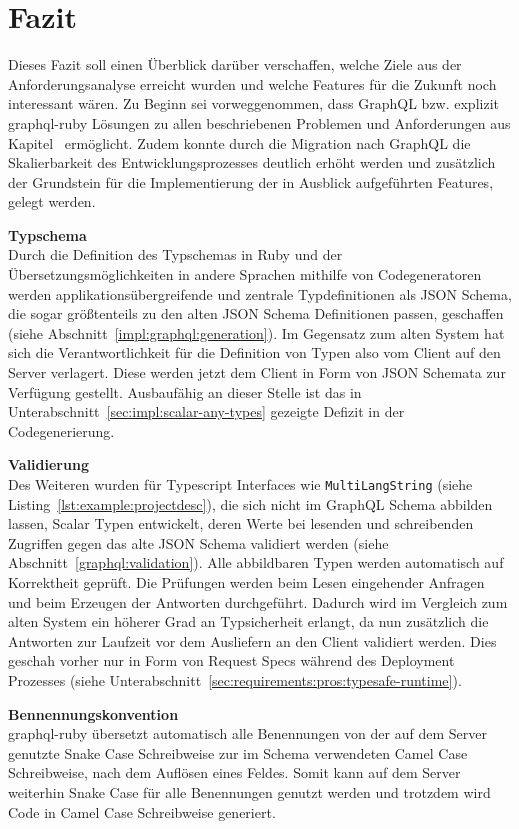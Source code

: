 \chapter{Fazit}
Dieses Fazit soll einen Überblick darüber verschaffen, welche Ziele aus der Anforderungsanalyse erreicht wurden und welche Features für die Zukunft noch interessant wären.
Zu Beginn sei vorweggenommen, dass GraphQL bzw. explizit graphql-ruby Lösungen zu allen beschriebenen Problemen und Anforderungen aus Kapitel~ ermöglicht. Zudem konnte durch die Migration nach GraphQL die Skalierbarkeit des Entwicklungsprozesses deutlich erhöht werden und zusätzlich der Grundstein für die Implementierung der in Ausblick aufgeführten Features, gelegt werden.

\textbf{Typschema} \ \\
Durch die Definition des Typschemas in Ruby und der Übersetzungsmöglichkeiten in andere Sprachen mithilfe von Codegeneratoren werden applikationsübergreifende und zentrale Typdefinitionen als JSON Schema,
die sogar größtenteils zu den alten JSON Schema Definitionen passen, geschaffen (siehe Abschnitt~\ref{impl:graphql:generation}). Im Gegensatz zum alten System hat sich die Verantwortlichkeit für die Definition von Typen also vom Client auf den Server verlagert. Diese werden jetzt dem Client in Form von JSON Schemata zur Verfügung gestellt. Ausbaufähig an dieser Stelle ist das in Unterabschnitt~\ref{sec:impl:scalar-any-types} gezeigte Defizit in der Codegenerierung.

\textbf{Validierung} \ \\
Des Weiteren wurden für Typescript Interfaces wie \texttt{MultiLangString} (siehe Listing~\ref{lst:example:projectdesc}),  die sich nicht im GraphQL Schema abbilden lassen, Scalar Typen entwickelt, deren Werte bei lesenden und schreibenden Zugriffen gegen das alte JSON Schema validiert werden (siehe Abschnitt~\ref{graphql:validation}). Alle abbildbaren Typen werden automatisch auf Korrektheit geprüft. Die Prüfungen werden beim Lesen eingehender Anfragen und beim Erzeugen der Antworten durchgeführt. Dadurch wird im Vergleich zum alten System ein höherer Grad an Typsicherheit erlangt, da nun zusätzlich die  Antworten zur Laufzeit vor dem Ausliefern an den Client validiert werden. Dies geschah vorher nur in Form von Request Specs während des Deployment Prozesses (siehe Unterabschnitt~\ref{sec:requirements:pros:typesafe-runtime}).

\textbf{Bennennungskonvention} \ \\
graphql-ruby übersetzt automatisch alle Benennungen von der auf dem Server genutzte Snake Case Schreibweise zur im Schema verwendeten Camel Case Schreibweise, nach dem Auflösen eines Feldes. Somit kann auf dem Server weiterhin Snake Case für alle Benennungen genutzt werden und trotzdem wird Code in Camel Case Schreibweise generiert.

